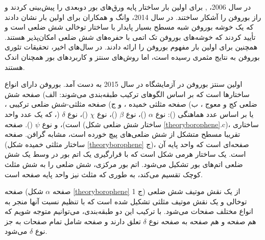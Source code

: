 در سال 2006،  ,  \cite{kunstmannBroadBoronSheets2006} برای اولین بار ساختار پایه ورق‌های بور دوبعدی را پیش‌بینی کردند و راز بوروفن را آشکار ساختند. در سال 2014، وانگ و همکاران \cite{zhaiObservationAllboronFullerene2014} برای اولین بار نشان دادند که  یک خوشه بوروفن شبه مسطح بسیار پایدار با ساختار توخالی شش ضلعی است و تأیید کردند که خوشه‌های بوروفن تک اتمی با حفره‌های شش ضلعی امکان‌پذیر هستند. همچنین برای اولین بار مفهوم بوروفن را ارائه دادند. در سال‌های اخیر، تحقیقات تئوری بوروفن به نتایج مثمری رسیده است، اما روش‌های سنتز و کاربردهای بور همچنان اندک هستند.

اولین سنتز بوروفن در آزمایشگاه در سال 2015 به دست آمد. بوروفن دارای انواع ساختارها است که بر اساس الگوهای ترکیب طبقه‌بندی می‌شوند: الف) صفحه شش ضلعی کج‌ و معوج ، ب) صفحه مثلثی خمیده ، و ج) صفحه مثلثی-شش ضلعی ترکیبی ، یا بر اساس عدد هماهنگی (): نوع $\alpha$ ()، نوع $\beta$ ()، نوع $\chi$ ()، نوع $\delta$ (، که  یک عدد واحد است)، و نوع $\psi$ ().\cite{wuTwoDimensionalBoronMonolayer2012}
صفحه  (ساختار شش ضلعی شکل \ref{theoryborophene}.c)، ساختاری تقریبا مسطح متشکل از شش ضلعی‌های پیچ خورده \cite{bezuglyHighlyConductiveBoron2011}است، مشابه گرافن. صفحه  (ساختار مثلثی خمیده شکل \ref{theoryborophene} ج)، صفحه‌ای است که واحد پایه آن  است.  یک ساختار هرمی شکل است که با قرارگیری یک اتم بور در وسط یک شش ضلعی اتم‌های بور تشکیل می‌شود. \cite{mannixSynthesisBorophenesAnisotropic2015, wuTwoDimensionalBoronMonolayer2012} اتم بور مرکزی، شش ضلعی را به شش مثلث کوچک تقسیم می‌کند، به طوری که مثلث نیز واحد پایه صفحه  است.

صفحه  (صفحه $\alpha$ شکل \ref{theoryborophene} 1 ج) از یک نقش موتیف شش ضلعی توخالی  و یک نقش موتیف مثلثی  تشکیل شده است که با تنظیم نسبت آنها منجر به انواع مختلف صفحات  می‌شود. \cite{yangInitioPredictionStable2008, tianPlanar2hB26H82013, penevPolymorphismTwoDimensionalBoron2012, tangFirstprinciplesStudyBoron2010, lauThermodynamicStabilityNovel2008, lauStabilityElectronicProperties2007} با ترکیب این دو طبقه‌بندی، می‌توانیم متوجه شویم که هم صفحه  و هم صفحه  به صفحه نوع $\delta$ تعلق دارند و صفحه  شامل تمام صفحات به جز نوع $\delta$ می‌شود.

